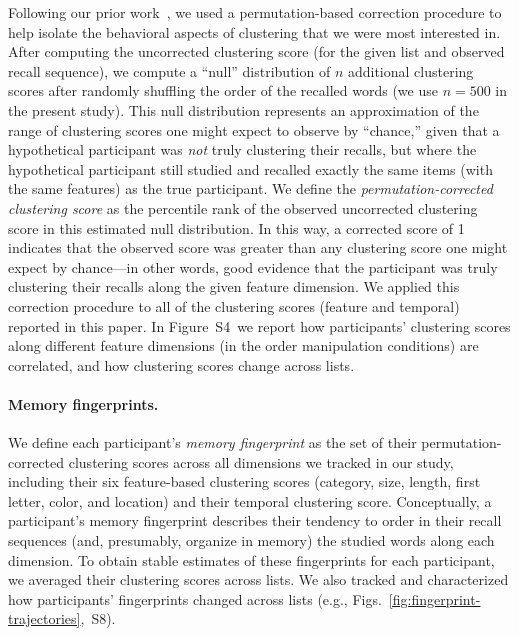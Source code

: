 \documentclass[11pt]{article}
\newcommand{\clusterCorrs}{S4}
\newcommand{\fingerprintTrajectoryRandom}{S8}
\begin{document}
Following our prior work~\citep{HeusEtal17}, we used a permutation-based
correction procedure to help isolate the behavioral aspects of clustering that
we were most interested in. After computing the uncorrected clustering score
(for the given list and observed recall sequence), we compute a ``null''
distribution of $n$ additional clustering scores after randomly shuffling the
order of the recalled words (we use $n = 500$ in the present study). This null
distribution represents an approximation of the range of clustering scores one
might expect to observe by ``chance,'' given that a hypothetical participant
was \textit{not} truly clustering their recalls, but where the hypothetical
participant still studied and recalled exactly the same items (with the same
features) as the true participant. We define the \textit{permutation-corrected
clustering score} as the percentile rank of the observed uncorrected clustering
score in this estimated null distribution. In this way, a corrected score of 1
indicates that the observed score was greater than any clustering score one
might expect by chance---in other words, good evidence that the participant was
truly clustering their recalls along the given feature dimension. We applied
this correction procedure to all of the clustering scores (feature and
temporal) reported in this paper. In Figure~\clusterCorrs~we report how
participants' clustering scores along different feature dimensions (in the
order manipulation conditions) are correlated, and how clustering scores change
across lists.

\paragraph*{Memory fingerprints.}

We define each participant's \textit{memory fingerprint} as the set of their
permutation-corrected clustering scores across all dimensions we tracked in our
study, including their six feature-based clustering scores (category, size,
length, first letter, color, and location) and their temporal clustering score.
Conceptually, a participant's memory fingerprint describes their tendency to
order in their recall sequences (and, presumably, organize in memory) the
studied words along each dimension. To obtain stable estimates of these
fingerprints for each participant, we averaged their clustering scores across
lists. We also tracked and characterized how participants' fingerprints changed
across lists (e.g.,
Figs.~\ref{fig:fingerprint-trajectories},~\fingerprintTrajectoryRandom).
\end{document}
